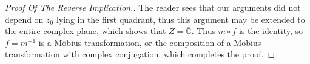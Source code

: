 \documentclass[12pt]{article}
\theoremstyle{definitionstyle}
\def\mbb#1{\mathbb{#1}}
\def \C{\mbb{C}}
\begin{document}
\begin{proof}[Proof Of The Reverse Implication.]
		The reader sees that our arguments did not depend on $z_0$ lying in the first quadrant, thus this argument may be extended to the entire complex plane, which shows that $Z = \overline{\C}$. Thus $m \circ f$ is the identity, so $f = m^{-1}$ is a Möbius transformation, or the composition of a Möbius transformation with complex conjugation, which completes the proof.
	\end{proof}



\end{document}
